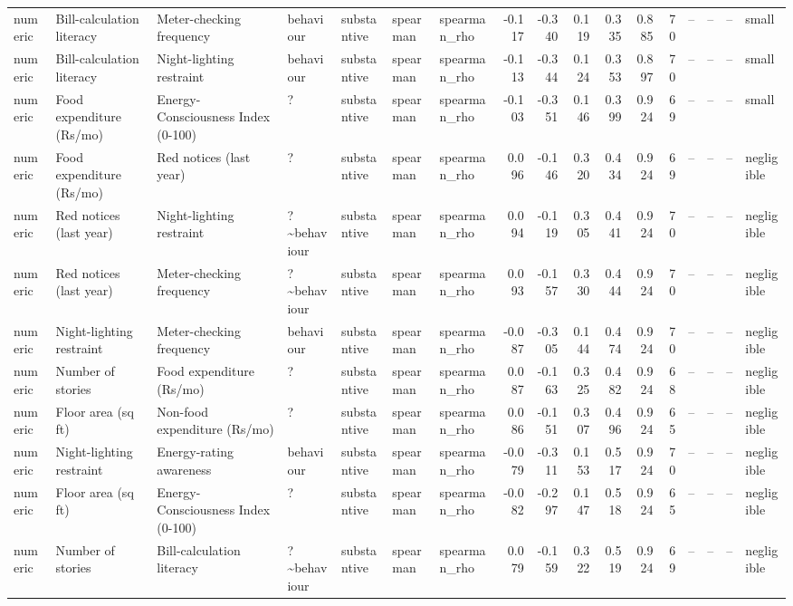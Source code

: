 \begin{table}
\begin{tabular}{lllllllrrrrrrrrrl}
numeric & Bill-calculation literacy & Meter-checking frequency & behaviour & substantive & spearman & spearman\_rho & -0.117 & -0.340 & 0.119 & 0.335 & 0.885 & 70 & -- & -- & -- & small \\
numeric & Bill-calculation literacy & Night-lighting restraint & behaviour & substantive & spearman & spearman\_rho & -0.113 & -0.344 & 0.124 & 0.353 & 0.897 & 70 & -- & -- & -- & small \\
numeric & Food expenditure (Rs/mo) & Energy-Consciousness Index (0-100) & ? & substantive & spearman & spearman\_rho & -0.103 & -0.351 & 0.146 & 0.399 & 0.924 & 69 & -- & -- & -- & small \\
numeric & Food expenditure (Rs/mo) & Red notices (last year) & ? & substantive & spearman & spearman\_rho & 0.096 & -0.146 & 0.320 & 0.434 & 0.924 & 69 & -- & -- & -- & negligible \\
numeric & Red notices (last year) & Night-lighting restraint & ?\textasciitilde behaviour & substantive & spearman & spearman\_rho & 0.094 & -0.119 & 0.305 & 0.441 & 0.924 & 70 & -- & -- & -- & negligible \\
numeric & Red notices (last year) & Meter-checking frequency & ?\textasciitilde behaviour & substantive & spearman & spearman\_rho & 0.093 & -0.157 & 0.330 & 0.444 & 0.924 & 70 & -- & -- & -- & negligible \\
numeric & Night-lighting restraint & Meter-checking frequency & behaviour & substantive & spearman & spearman\_rho & -0.087 & -0.305 & 0.144 & 0.474 & 0.924 & 70 & -- & -- & -- & negligible \\
numeric & Number of stories & Food expenditure (Rs/mo) & ? & substantive & spearman & spearman\_rho & 0.087 & -0.163 & 0.325 & 0.482 & 0.924 & 68 & -- & -- & -- & negligible \\
numeric & Floor area (sq ft) & Non-food expenditure (Rs/mo) & ? & substantive & spearman & spearman\_rho & 0.086 & -0.151 & 0.307 & 0.496 & 0.924 & 65 & -- & -- & -- & negligible \\
numeric & Night-lighting restraint & Energy-rating awareness & behaviour & substantive & spearman & spearman\_rho & -0.079 & -0.311 & 0.153 & 0.517 & 0.924 & 70 & -- & -- & -- & negligible \\
numeric & Floor area (sq ft) & Energy-Consciousness Index (0-100) & ? & substantive & spearman & spearman\_rho & -0.082 & -0.297 & 0.147 & 0.518 & 0.924 & 65 & -- & -- & -- & negligible \\
numeric & Number of stories & Bill-calculation literacy & ?\textasciitilde behaviour & substantive & spearman & spearman\_rho & 0.079 & -0.159 & 0.322 & 0.519 & 0.924 & 69 & -- & -- & -- & negligible \\

\end{tabular}
\end{table}
